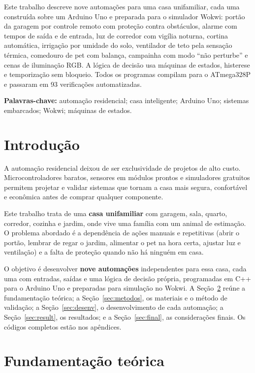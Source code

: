 \documentclass[12pt]{article}
\begin{document}
\begin{resumo}
Este trabalho descreve nove automações para uma casa unifamiliar, cada uma construída sobre um Arduino Uno e preparada para o simulador Wokwi: portão da garagem por controle remoto com proteção contra obstáculos, alarme com tempos de saída e de entrada, luz de corredor com vigília noturna, cortina automática, irrigação por umidade do solo, ventilador de teto pela sensação térmica, comedouro de pet com balança, campainha com modo ``não perturbe'' e cenas de iluminação RGB. A lógica de decisão usa máquinas de estados, histerese e temporização sem bloqueio. Todos os programas compilam para o ATmega328P e passaram em 93 verificações automatizadas.
\end{resumo}

\noindent\textbf{Palavras-chave:} automação residencial; casa inteligente; Arduino Uno; sistemas embarcados; Wokwi; máquinas de estados.

\section{Introdução}

A automação residencial deixou de ser exclusividade de projetos de alto custo. Microcontroladores baratos, sensores em módulos prontos e simuladores gratuitos permitem projetar e validar sistemas que tornam a casa mais segura, confortável e econômica antes de comprar qualquer componente.

Este trabalho trata de uma \textbf{casa unifamiliar} com garagem, sala, quarto, corredor, cozinha e jardim, onde vive uma família com um animal de estimação. O problema abordado é a dependência de ações manuais e repetitivas (abrir o portão, lembrar de regar o jardim, alimentar o pet na hora certa, ajustar luz e ventilação) e a falta de proteção quando não há ninguém em casa.

O objetivo é desenvolver \textbf{nove automações} independentes para essa casa, cada uma com entradas, saídas e uma lógica de decisão própria, programadas em C++ para o Arduino Uno e preparadas para simulação no Wokwi. A Seção~\ref{sec:fund} reúne a fundamentação teórica; a Seção~\ref{sec:metodos}, os materiais e o método de validação; a Seção~\ref{sec:desenv}, o desenvolvimento de cada automação; a Seção~\ref{sec:result}, os resultados; e a Seção~\ref{sec:final}, as considerações finais. Os códigos completos estão nos apêndices.

\section{Fundamentação teórica}\label{sec:fund}
\end{document}
